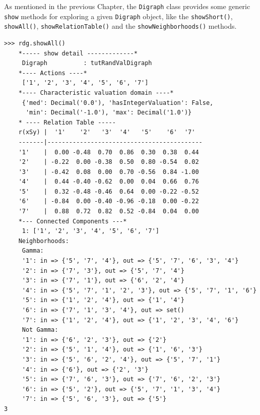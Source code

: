 As mentioned in the previous Chapter, the {\tt Digraph} class provides some generic {\tt show} methods for exploring a given {\tt Digraph} object, like the {\tt showShort()}, {\tt showAll()}, {\tt showRelationTable()} and the {\tt showNeighborhoods()} methods.

\begin{lstlisting}[caption=Example of random valuation digraph,label=list:2.2,basicstyle=\footnotesize]
   >>> rdg.showAll()
    *----- show detail -------------*
     Digraph          : tutRandValDigraph
    *---- Actions ----*
     ['1', '2', '3', '4', '5', '6', '7']
    *---- Characteristic valuation domain ----*
     {'med': Decimal('0.0'), 'hasIntegerValuation': False, 
      'min': Decimal('-1.0'), 'max': Decimal('1.0')}
    * ---- Relation Table -----
    r(xSy) |  '1'    '2'   '3'  '4'   '5'    '6'  '7'	  
    -------|-------------------------------------------
    '1'    |  0.00 -0.48  0.70  0.86  0.30  0.38  0.44	 
    '2'    | -0.22  0.00 -0.38  0.50  0.80 -0.54  0.02	 
    '3'    | -0.42  0.08  0.00  0.70 -0.56  0.84 -1.00	 
    '4'    |  0.44 -0.40 -0.62  0.00  0.04  0.66  0.76	 
    '5'    |  0.32 -0.48 -0.46  0.64  0.00 -0.22 -0.52	 
    '6'    | -0.84  0.00 -0.40 -0.96 -0.18  0.00 -0.22	 
    '7'    |  0.88  0.72  0.82  0.52 -0.84  0.04  0.00
    *--- Connected Components ---*
     1: ['1', '2', '3', '4', '5', '6', '7']
    Neighborhoods:
     Gamma:
     '1': in => {'5', '7', '4'}, out => {'5', '7', '6', '3', '4'}
     '2': in => {'7', '3'}, out => {'5', '7', '4'}
     '3': in => {'7', '1'}, out => {'6', '2', '4'}
     '4': in => {'5', '7', '1', '2', '3'}, out => {'5', '7', '1', '6'}
     '5': in => {'1', '2', '4'}, out => {'1', '4'}
     '6': in => {'7', '1', '3', '4'}, out => set()
     '7': in => {'1', '2', '4'}, out => {'1', '2', '3', '4', '6'}
     Not Gamma:
     '1': in => {'6', '2', '3'}, out => {'2'}
     '2': in => {'5', '1', '4'}, out => {'1', '6', '3'}
     '3': in => {'5', '6', '2', '4'}, out => {'5', '7', '1'}
     '4': in => {'6'}, out => {'2', '3'}
     '5': in => {'7', '6', '3'}, out => {'7', '6', '2', '3'}
     '6': in => {'5', '2'}, out => {'5', '7', '1', '3', '4'}
     '7': in => {'5', '6', '3'}, out => {'5'}
3 \end{lstlisting}   


